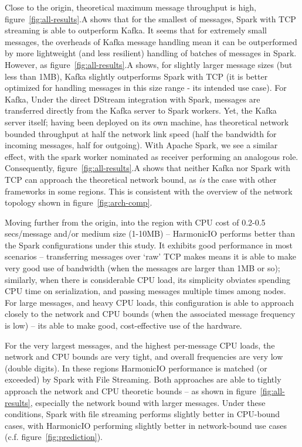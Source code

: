 \documentclass[conference]{IEEEtran}
\begin{document}
Close to the origin, theoretical maximum message throughput is high, figure~\ref{fig:all-results}.A shows that for the smallest of messages, Spark with TCP streaming is able to outperform Kafka. It seems that for extremely small messages, the overheads of Kafka message handling mean it can be outperformed by more lightweight (and less resilient) handling of batches of messages in Spark. However, as figure~\ref{fig:all-results}.A shows, for slightly larger message sizes (but less than 1MB), Kafka slightly outperforms Spark with TCP (it is better optimized for handling messages in this size range - its intended use case). For Kafka, Under the direct DStream integration with Spark, messages are transferred directly from the Kafka server to Spark workers. Yet, the Kafka server itself; having been deployed on its own machine, has theoretical network bounded throughput at half the network link speed (half the bandwidth for incoming messages, half for outgoing). With Apache Spark, we see a similar effect, with the spark worker nominated as receiver performing an analogous role. Consequently, figure~\ref{fig:all-results}.A shows that neither Kafka nor Spark with TCP can approach the theoretical network bound, as \emph{is} the case with other frameworks in some regions. This is consistent with the overview of the network topology shown in figure~\ref{fig:arch-comp}.


Moving further from the origin, into the region with CPU cost of 0.2-0.5 secs/message and/or medium size (1-10MB) -- HarmonicIO performs better than the Spark configurations under this study. 
It exhibits good performance in most scenarios -- transferring messages over `raw’ TCP makes means it is able to make very good use of bandwidth (when the messages are larger than 1MB or so); similarly, when there is considerable CPU load, its simplicity obviates spending CPU time on serialization, and passing messages multiple times among nodes. %
For large messages, and heavy CPU loads, this configuration is able to approach closely to the network and CPU bounds (when the associated message frequency is low) -- its able to make good, cost-effective use of the hardware.

For the very largest messages, and the highest per-message CPU loads, the network and CPU bounds are very tight, and overall frequencies are very low (double digits). In these regions HarmonicIO performance is matched (or exceeded) by Spark with File Streaming. Both approaches are able to tightly approach the network and CPU theoretic bounds -- as shown in figure~\ref{fig:all-results}, especially the network bound with larger messages. Under these conditions, Spark with file streaming performs slightly better in CPU-bound cases, with HarmonicIO performing slightly better in network-bound use cases (c.f. figure~\ref{fig:prediction}). 
\end{document}
